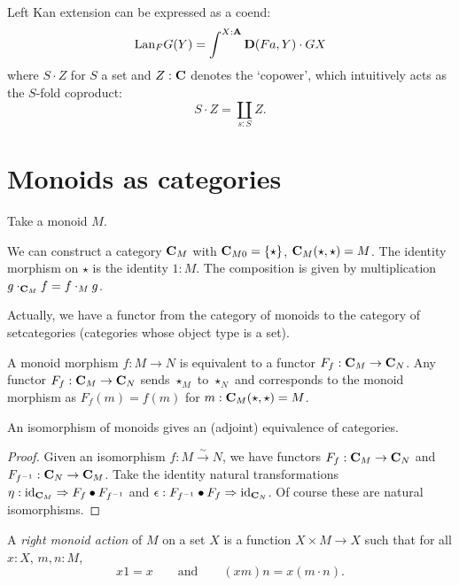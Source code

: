 \begin{remark}
  Left Kan extension can be expressed as a coend:
  \[ \text{Lan}_{F}G(Y) = \int^{X : \mathbf{A}} \mathbf{D}(F a, Y) \cdot G X \]
  where $ S \cdot Z $ for $ S $ a set and $ Z : \mathbf{C} $ denotes the `copower', which intuitively acts as the $ S $-fold coproduct:
  \[ S \cdot Z = \coprod_{s : S} Z. \]
\end{remark}


\section{Monoids as categories}\label{sec:monoid-category}
Take a monoid $ M $.
\begin{definition}
  We can construct a category $ \mathbf{C}_M $ with $ \mathbf{C}_{M0} = \{ \star \} $, $ \mathbf{C}_M(\star, \star) = M $. The identity morphism on $ \star $ is the identity $ 1: M $. The composition is given by multiplication $ g \cdot_{\mathbf{C}_M} f = f \cdot_M g $.
\end{definition}

\begin{remark}
  Actually, we have a functor from the category of monoids to the category of setcategories (categories whose object type is a set).

  A monoid morphism $ f: M \to N $ is equivalent to a functor $ F_f: \mathbf{C}_M \to \mathbf{C}_N $. Any functor $ F_f : \mathbf{C}_M \to \mathbf{C}_N $ sends $ \star_M $ to $ \star_N $ and corresponds to the monoid morphism as $ F_f(m) = f(m) $ for $ m: \mathbf{C}_M(\star, \star) = M $.
\end{remark}

\begin{lemma}
  An isomorphism of monoids gives an (adjoint) equivalence of categories.
\end{lemma}
\begin{proof}
  Given an isomorphism $ f: M \xrightarrow \sim N $, we have functors $ F_f: \mathbf{C}_M \to \mathbf{C}_N $ and $ F_{f^{-1}}: \mathbf{C}_N \to \mathbf{C}_M $. Take the identity natural transformations $ \eta: \text{id}_{\mathbf{C}_M} \Rightarrow F_f \bullet F_{f^{-1}} $ and $ \epsilon: F_{f^{-1}} \bullet F_f \Rightarrow \text{id}_{\mathbf{C}_N} $. Of course these are natural isomorphisms.
\end{proof}

\begin{definition}
  A \textit{right monoid action} of $ M $ on a set $ X $ is a function $ X \times M \to X $ such that for all $ x: X $, $ m, n: M $,
  \[ x 1 = x \qquad \text{and} \qquad (x m) n = x (m \cdot n). \]
\end{definition}

